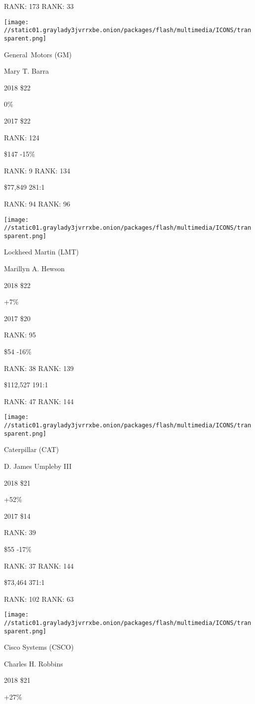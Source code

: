 RANK: 173 RANK: 33

\texttt{[image: //static01.graylady3jvrrxbe.onion/packages/flash/multimedia/ICONS/transparent.png]}

General~Motors (GM)

Mary T. Barra \protect\hyperlink{g-footnotes}{}

2018 \$22

 0\%

2017 \$22

RANK: 124

 \$147 -15\%

RANK: 9 RANK: 134

 \$77,849 281:1

RANK: 94 RANK: 96

\texttt{[image: //static01.graylady3jvrrxbe.onion/packages/flash/multimedia/ICONS/transparent.png]}

Lockheed Martin (LMT)

Marillyn A. Hewson \protect\hyperlink{g-footnotes}{}

2018 \$22

 +7\%

2017 \$20

RANK: 95

 \$54 -16\%

RANK: 38 RANK: 139

 \$112,527 191:1

RANK: 47 RANK: 144

\texttt{[image: //static01.graylady3jvrrxbe.onion/packages/flash/multimedia/ICONS/transparent.png]}

Caterpillar (CAT)

D. James Umpleby III \protect\hyperlink{g-footnotes}{}

2018 \$21

 +52\%

2017 \$14

RANK: 39

 \$55 -17\%

RANK: 37 RANK: 144

 \$73,464 371:1

RANK: 102 RANK: 63

\texttt{[image: //static01.graylady3jvrrxbe.onion/packages/flash/multimedia/ICONS/transparent.png]}

Cisco Systems (CSCO)

Charles H. Robbins \protect\hyperlink{g-footnotes}{}

2018 \$21

 +27\%

